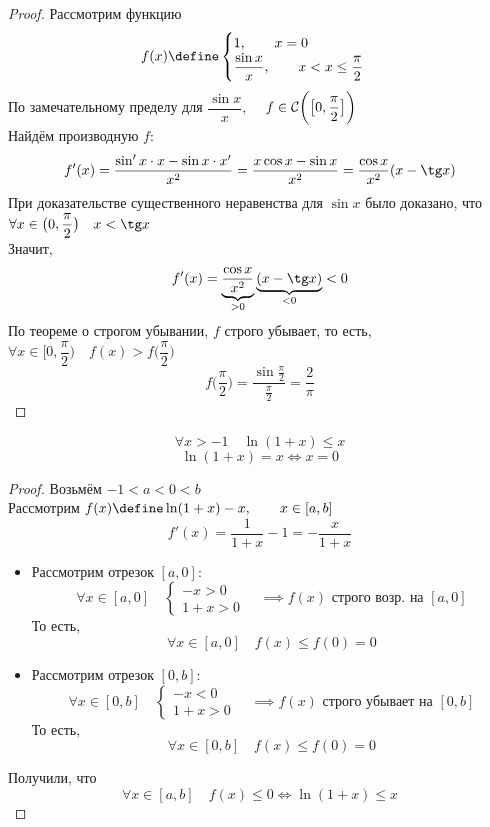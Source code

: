 \begin{proof}
	Рассмотрим функцию
    $$ f(x) \define
    \begin{cases}
    	1, \qquad x = 0 \\
        \dfrac{\sin x}x, \qquad x < x \le \dfrac\pi2
    \end{cases} $$
    По замечательному пределу для $ \dfrac{\sin x}x $, $ \quad f \in \mathcal{C} \bigg( {\big[ 0, \dfrac\pi2 \big]} \bigg)  $ \\
    Найдём производную $ f $:
    $$ f'(x) = \frac{\sin' x \cdot x - \sin x \cdot x'}{x^2} = \frac{x\cos x - \sin x}{x^2} = \frac{\cos x}{x^2}(x - \tg x) $$
    При доказательстве существенного неравенства для $ \sin x $ было доказано, что $ \forall x \in \big( 0, \dfrac\pi2 \big) \quad x < \tg x $ \\
    Значит,
    $$ f'(x) = \underbrace{\frac{\cos x}{x^2}}_{> 0}\underbrace{(x - \tg x)}_{< 0} < 0 $$
    По теореме о строгом убывании, $ f $ строго убывает, то есть, $ \forall x \in \big[ 0, \dfrac\pi2 \big) \quad f(x) > f \big( \dfrac\pi2 \big) $
    $$ f \big( \frac\pi2 \big) = \frac{\sin \frac\pi2}{\frac\pi2} = \frac2\pi $$
\end{proof}

\begin{statement}
	$$ \forall x > -1 \quad \ln(1 + x) \le x $$
    $$ \ln(1 + x) = x \iff x = 0 $$
\end{statement}

\begin{proof}
	Возьмём $ -1 < a < 0 < b $ \\
    Рассмотрим $ f(x) \define \ln(1 + x) - x, \qquad x \in [a, b] $
    $$ f'(x) = \frac1{1 + x} - 1 = -\frac{x}{1 + x} $$
    \begin{itemize}
    	\item Рассмотрим отрезок $ [a, 0] $:
        $$ \forall x \in [a, 0] \quad
        \begin{cases}
        	-x > 0 \\
            1 + x > 0
        \end{cases} \quad \implies f(x) \text{ строго возр. на } [a, 0] $$
        То есть,
        $$ \forall x \in [a, 0] \quad f(x) \le f(0) = 0 $$
        \item Рассмотрим отрезок $ [0, b] $:
        $$ \forall x \in [0, b] \quad
        \begin{cases}
        	-x < 0 \\
            1 + x > 0
        \end{cases} \quad \implies f(x) \text{ строго убывает на } [0, b] $$
        То есть,
        $$ \forall x \in [0, b] \quad f(x) \le f(0) = 0 $$
    \end{itemize}
    Получили, что
    $$ \forall x \in [a, b] \quad f(x) \le 0 \iff \ln(1 + x) \le x $$
\end{proof}


